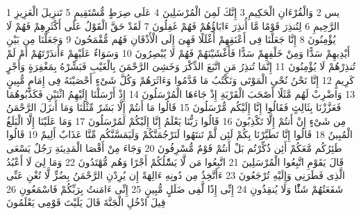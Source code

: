 \documentclass[20pt,a4paper]{article}
\title{}
\author{}
\date{}
\begin{document}
\pagecolor{cl_page}



{\tiny\colorbox{cl_aya}{1}} يس
{\tiny\colorbox{cl_aya}{2}} وَالْقُرْءَانِ الْحَكِيمِ
{\tiny\colorbox{cl_aya}{3}} إِنَّكَ لَمِنَ الْمُرْسَلِينَ
{\tiny\colorbox{cl_aya}{4}} عَلَى صِرَطٍ مُّسْتَقِيمٍ
{\tiny\colorbox{cl_aya}{5}} تَنزِيلَ الْعَزِيزِ الرَّحِيمِ
{\tiny\colorbox{cl_aya}{6}} لِتُنذِرَ قَوْمًا مَّا أُنذِرَ ءَابَاؤُهُمْ فَهُمْ غَفِلُونَ
{\tiny\colorbox{cl_aya}{7}} لَقَدْ حَقَّ الْقَوْلُ عَلَى أَكْثَرِهِمْ فَهُمْ لَا يُؤْمِنُونَ
{\tiny\colorbox{cl_aya}{8}} إِنَّا جَعَلْنَا فِى أَعْنَقِهِمْ أَغْلَلًا فَهِىَ إِلَى الْأَذْقَانِ فَهُم مُّقْمَحُونَ
{\tiny\colorbox{cl_aya}{9}} وَجَعَلْنَا مِن بَيْنِ أَيْدِيهِمْ سَدًّا وَمِنْ خَلْفِهِمْ سَدًّا فَأَغْشَيْنَهُمْ فَهُمْ لَا يُبْصِرُونَ
{\tiny\colorbox{cl_aya}{10}} وَسَوَاءٌ عَلَيْهِمْ ءَأَنذَرْتَهُمْ أَمْ لَمْ تُنذِرْهُمْ لَا يُؤْمِنُونَ
{\tiny\colorbox{cl_aya}{11}} إِنَّمَا تُنذِرُ مَنِ اتَّبَعَ الذِّكْرَ وَخَشِىَ الرَّحْمَنَ بِالْغَيْبِ فَبَشِّرْهُ بِمَغْفِرَةٍ وَأَجْرٍ كَرِيمٍ
{\tiny\colorbox{cl_aya}{12}} إِنَّا نَحْنُ نُحْىِ الْمَوْتَى وَنَكْتُبُ مَا قَدَّمُوا وَءَاثَرَهُمْ وَكُلَّ شَىْءٍ أَحْصَيْنَهُ فِى إِمَامٍ مُّبِينٍ
{\tiny\colorbox{cl_aya}{13}} وَاضْرِبْ لَهُم مَّثَلًا أَصْحَبَ الْقَرْيَةِ إِذْ جَاءَهَا الْمُرْسَلُونَ
{\tiny\colorbox{cl_aya}{14}} إِذْ أَرْسَلْنَا إِلَيْهِمُ اثْنَيْنِ فَكَذَّبُوهُمَا فَعَزَّزْنَا بِثَالِثٍ فَقَالُوا إِنَّا إِلَيْكُم مُّرْسَلُونَ
{\tiny\colorbox{cl_aya}{15}} قَالُوا مَا أَنتُمْ إِلَّا بَشَرٌ مِّثْلُنَا وَمَا أَنزَلَ الرَّحْمَنُ مِن شَىْءٍ إِنْ أَنتُمْ إِلَّا تَكْذِبُونَ
{\tiny\colorbox{cl_aya}{16}} قَالُوا رَبُّنَا يَعْلَمُ إِنَّا إِلَيْكُمْ لَمُرْسَلُونَ
{\tiny\colorbox{cl_aya}{17}} وَمَا عَلَيْنَا إِلَّا الْبَلَغُ الْمُبِينُ
{\tiny\colorbox{cl_aya}{18}} قَالُوا إِنَّا تَطَيَّرْنَا بِكُمْ لَئِن لَّمْ تَنتَهُوا لَنَرْجُمَنَّكُمْ وَلَيَمَسَّنَّكُم مِّنَّا عَذَابٌ أَلِيمٌ
{\tiny\colorbox{cl_aya}{19}} قَالُوا طَئِرُكُم مَّعَكُمْ أَئِن ذُكِّرْتُم بَلْ أَنتُمْ قَوْمٌ مُّسْرِفُونَ
{\tiny\colorbox{cl_aya}{20}} وَجَاءَ مِنْ أَقْصَا الْمَدِينَةِ رَجُلٌ يَسْعَى قَالَ يَقَوْمِ اتَّبِعُوا الْمُرْسَلِينَ
{\tiny\colorbox{cl_aya}{21}} اتَّبِعُوا مَن لَّا يَسَْٔلُكُمْ أَجْرًا وَهُم مُّهْتَدُونَ
{\tiny\colorbox{cl_aya}{22}} وَمَا لِىَ لَا أَعْبُدُ الَّذِى فَطَرَنِى وَإِلَيْهِ تُرْجَعُونَ
{\tiny\colorbox{cl_aya}{23}} ءَأَتَّخِذُ مِن دُونِهِ ءَالِهَةً إِن يُرِدْنِ الرَّحْمَنُ بِضُرٍّ لَّا تُغْنِ عَنِّى شَفَعَتُهُمْ شَئًْا وَلَا يُنقِذُونِ
{\tiny\colorbox{cl_aya}{24}} إِنِّى إِذًا لَّفِى ضَلَلٍ مُّبِينٍ
{\tiny\colorbox{cl_aya}{25}} إِنِّى ءَامَنتُ بِرَبِّكُمْ فَاسْمَعُونِ
{\tiny\colorbox{cl_aya}{26}} قِيلَ ادْخُلِ الْجَنَّةَ قَالَ يَلَيْتَ قَوْمِى يَعْلَمُونَ
\end{document}
